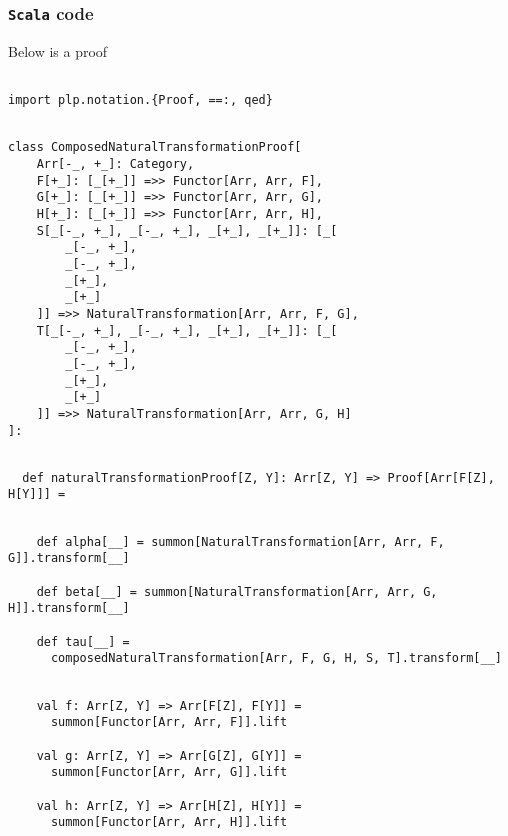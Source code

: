 \documentclass[11pt]{article}
\newcommand{\code}{\subsubsection{{\tt Scala} code}\begingroup\rm \vspace{12pt}}
\begin{document}
\code

Below is a proof  

\vspace{6pt}
\begin{mdframed}[backgroundcolor=lightgray!20] 
\begin{lstlisting}

import plp.notation.{Proof, ==:, qed}
\end{lstlisting}
\end{mdframed}
\vspace{6pt}
\clearpage
\begin{mdframed}[backgroundcolor=lightgray!20] 
\begin{lstlisting}

class ComposedNaturalTransformationProof[
    Arr[-_, +_]: Category,
    F[+_]: [_[+_]] =>> Functor[Arr, Arr, F],
    G[+_]: [_[+_]] =>> Functor[Arr, Arr, G],
    H[+_]: [_[+_]] =>> Functor[Arr, Arr, H],
    S[_[-_, +_], _[-_, +_], _[+_], _[+_]]: [_[
        _[-_, +_],
        _[-_, +_],
        _[+_],
        _[+_]
    ]] =>> NaturalTransformation[Arr, Arr, F, G],
    T[_[-_, +_], _[-_, +_], _[+_], _[+_]]: [_[
        _[-_, +_],
        _[-_, +_],
        _[+_],
        _[+_]
    ]] =>> NaturalTransformation[Arr, Arr, G, H]
]:
\end{lstlisting}
\end{mdframed}
\vspace{6pt}
\begin{mdframed}[backgroundcolor=lightgray!20] 
\begin{lstlisting}

  def naturalTransformationProof[Z, Y]: Arr[Z, Y] => Proof[Arr[F[Z], H[Y]]] =
\end{lstlisting}
\end{mdframed}
\vspace{6pt}
\begin{mdframed}[backgroundcolor=lightgray!20] 
\begin{lstlisting}

    def alpha[__] = summon[NaturalTransformation[Arr, Arr, F, G]].transform[__]

    def beta[__] = summon[NaturalTransformation[Arr, Arr, G, H]].transform[__]
    
    def tau[__] =
      composedNaturalTransformation[Arr, F, G, H, S, T].transform[__]
\end{lstlisting}
\end{mdframed}
\vspace{6pt}
\begin{mdframed}[backgroundcolor=lightgray!20] 
\begin{lstlisting}

    val f: Arr[Z, Y] => Arr[F[Z], F[Y]] =
      summon[Functor[Arr, Arr, F]].lift

    val g: Arr[Z, Y] => Arr[G[Z], G[Y]] =
      summon[Functor[Arr, Arr, G]].lift

    val h: Arr[Z, Y] => Arr[H[Z], H[Y]] =
      summon[Functor[Arr, Arr, H]].lift
\end{lstlisting}
\end{mdframed}
\end{document}
